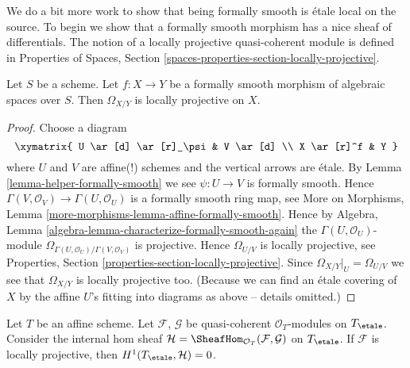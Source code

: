 \noindent
We do a bit more work to show that being formally smooth is \'etale local
on the source. To begin we show that a formally smooth morphism has a nice
sheaf of differentials. The notion of a locally projective quasi-coherent
module is defined in
Properties of Spaces,
Section \ref{spaces-properties-section-locally-projective}.

\begin{lemma}
\label{lemma-formally-smooth-sheaf-differentials}
Let $S$ be a scheme.
Let $f : X \to Y$ be a formally smooth morphism of algebraic spaces over $S$.
Then $\Omega_{X/Y}$ is locally projective on $X$.
\end{lemma}

\begin{proof}
Choose a diagram
$$
\xymatrix{
U \ar[d] \ar[r]_\psi & V \ar[d] \\
X \ar[r]^f & Y
}
$$
where $U$ and $V$ are affine(!) schemes and the vertical arrows are \'etale.
By
Lemma \ref{lemma-helper-formally-smooth}
we see $\psi : U \to V$ is formally smooth. Hence
$\Gamma(V, \mathcal{O}_V) \to \Gamma(U, \mathcal{O}_U)$ is
a formally smooth ring map, see
More on Morphisms, Lemma \ref{more-morphisms-lemma-affine-formally-smooth}.
Hence by
Algebra, Lemma \ref{algebra-lemma-characterize-formally-smooth-again}
the $\Gamma(U, \mathcal{O}_U)$-module
$\Omega_{\Gamma(U, \mathcal{O}_U)/\Gamma(V, \mathcal{O}_V)}$
is projective. Hence $\Omega_{U/V}$ is locally projective, see
Properties, Section \ref{properties-section-locally-projective}.
Since $\Omega_{X/Y}|_U = \Omega_{U/V}$ we see that $\Omega_{X/Y}$ is
locally projective too. (Because we can find an \'etale covering of
$X$ by the affine $U$'s fitting into diagrams as above -- details
omitted.)
\end{proof}

\begin{lemma}
\label{lemma-h1-is-zero}
Let $T$ be an affine scheme.
Let $\mathcal{F}$, $\mathcal{G}$ be quasi-coherent
$\mathcal{O}_T$-modules on $T_\etale$.
Consider the internal hom sheaf
$\mathcal{H} = \SheafHom_{\mathcal{O}_T}(\mathcal{F}, \mathcal{G})$
on $T_\etale$.
If $\mathcal{F}$ is locally projective, then
$H^1(T_\etale, \mathcal{H}) = 0$.
\end{lemma}


